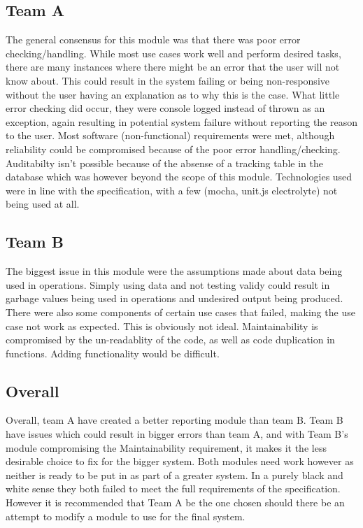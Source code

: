 \subsection{Team A}
The general consensus for this module was that there was poor error checking/handling. While most use cases work well and perform desired tasks, there are many instances where there might be an error that the user will not know about. This could result in the system failing or being non-responsive without the user having an explanation as to why this is the case. What little error checking did occur, they were console logged instead of thrown as an exception, again resulting in potential system failure without reporting the reason to the user.
\newline \newline
Most software (non-functional) requirements were met, although reliability could be compromised because of the poor error handling/checking. Auditabilty isn't possible because of the absense of a tracking table in the database which was however beyond the scope of this module. 
\newline \newline
Technologies used were in line with the specification, with a few (mocha, unit.js electrolyte) not being used at all.

\subsection{Team B}
The biggest issue in this module were the assumptions made about data being used in operations. Simply using data and not testing validy could result in garbage values being used in operations and undesired output being produced. There were also some components of certain use cases that failed, making the use case not work as expected. This is obviously not ideal.
\newline \newline
Maintainability is compromised by the un-readablity of the code, as well as code duplication in functions. Adding functionality would be difficult.  

\subsection{Overall}
Overall, team A have created a better reporting module than team B. Team B have issues which could result in bigger errors than team A, and with Team B's module compromising the Maintainability requirement, it makes it the less desirable choice to fix for the bigger system. 
\newline \newline
Both modules need work however as neither is ready to be put in as part of a greater system. In a purely black and white sense they both failed to meet the full requirements of the specification. However it is recommended that Team A be the one chosen should there be an attempt to modify a module to use for the final system. 